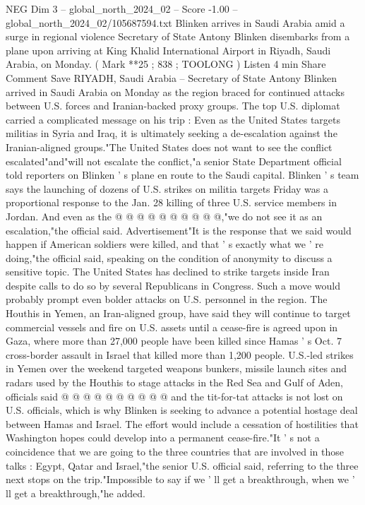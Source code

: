 \begin{textsample}{NEG Dim 3 – global\_north\_2024\_02 – Score -1.00 – global\_north\_2024\_02/105687594.txt}  \label{ex:f3_neg_209}
Blinken arrives in Saudi Arabia amid a surge in regional violence Secretary of State Antony Blinken disembarks from a plane upon arriving at King Khalid International Airport in Riyadh, Saudi Arabia, on Monday. ( Mark **25 ; 838 ; TOOLONG ) Listen 4 min Share Comment Save RIYADH, Saudi Arabia -- Secretary of State Antony Blinken arrived in Saudi Arabia on Monday as the region braced for continued attacks between U.S. forces and Iranian-backed proxy groups.
The top U.S. diplomat carried a complicated message on his trip : Even as the United States targets militias in Syria and Iraq, it is ultimately seeking a de-escalation against the Iranian-aligned groups."The United States does not want to see the conflict escalated"and"will not escalate the conflict,"a senior State Department official told reporters on Blinken ' s plane en route to the Saudi capital.
Blinken ' s team says the launching of dozens of U.S. strikes on militia targets Friday was a proportional response to the Jan. 28 killing of three U.S. service members in Jordan.
And even as the @ @ @ @ @ @ @ @ @ @,"we do not see it as an escalation,"the official said.
Advertisement"It is the response that we said would happen if American soldiers were killed, and that ' s exactly what we ' re doing,"the official said, speaking on the condition of anonymity to discuss a sensitive topic.
The United States has declined to strike targets inside Iran despite calls to do so by several Republicans in Congress.
Such a move would probably prompt even bolder attacks on U.S. personnel in the region.
The Houthis in Yemen, an Iran-aligned group, have said they will continue to target commercial vessels and fire on U.S. assets until a cease-fire is agreed upon in Gaza, where more than 27,000 people have been killed since Hamas ' s Oct. 7 cross-border assault in Israel that killed more than 1,200 people.
U.S.-led strikes in Yemen over the weekend targeted weapons bunkers, missile launch sites and radars used by the Houthis to stage attacks in the Red Sea and Gulf of Aden, officials said @ @ @ @ @ @ @ @ @ @ and the tit-for-tat attacks is not lost on U.S. officials, which is why Blinken is seeking to advance a potential hostage deal between Hamas and Israel.
The effort would include a cessation of hostilities that Washington hopes could develop into a permanent cease-fire."It ' s not a coincidence that we are going to the three countries that are involved in those talks : Egypt, Qatar and Israel,"the senior U.S. official said, referring to the three next stops on the trip."Impossible to say if we ' ll get a breakthrough, when we ' ll get a breakthrough,"he added.

\end{textsample}

